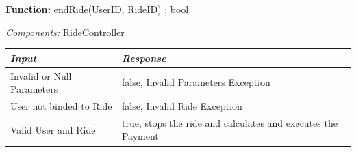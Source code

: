 \documentclass[a4paper]{article}
\begin{document}
\textbf{Function:} endRide(UserID, RideID) : bool \par
\textit{Components:} RideController
\begin{center}
\begin{tabular}{ | L{6cm} | L{6cm} | }
\hline
	\textit{Input}& \textit{Response}\\ \hline
	Invalid or Null Parameters & false, Invalid Parameters Exception\\ \hline
	User not binded to Ride & false, Invalid Ride Exception\\ \hline
	Valid User and Ride& true, stops the ride and calculates and executes the Payment\\ \hline
\end{tabular}
\end{center}
\newpage
\end{document}

